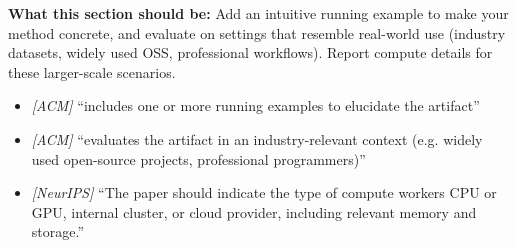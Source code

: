 \noindent\textbf{What this section should be:}
Add an intuitive running example to make your method concrete, and evaluate on settings that resemble real-world use (industry datasets, widely used OSS, professional workflows). Report compute details for these larger-scale scenarios.
\begin{itemize}
  \item \textit{[ACM]} ``includes one or more running examples to elucidate the artifact''
  \item \textit{[ACM]} ``evaluates the artifact in an industry-relevant context (e.g. widely used open-source projects, professional programmers)''
  \item \textit{[NeurIPS]} ``The paper should indicate the type of compute workers CPU or GPU, internal cluster, or cloud provider, including relevant memory and storage.''
\end{itemize}